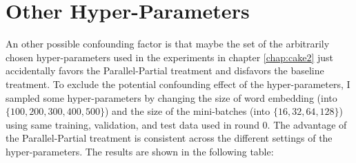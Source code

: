 \documentclass[final]{ua-thesis}
\numberwithin{equation}{section}
\begin{document}
\section{Other Hyper-Parameters}
An other possible confounding factor is that maybe the set of the arbitrarily chosen hyper-parameters used in the experiments in chapter \ref{chap:cake2} just accidentally favors the Parallel-Partial treatment and disfavors the baseline treatment. To exclude the potential confounding effect of the hyper-parameters, I sampled some hyper-parameters by changing the size of word embedding (into $\{100, 200, 300, 400, 500\}$) and the size of the mini-batches (into $\{16, 32, 64, 128\}$) using same training, validation, and test data used in round 0. The advantage of the Parallel-Partial treatment is consistent across the different settings of the hyper-parameters. The results are shown in the following table:  
\end{document}
